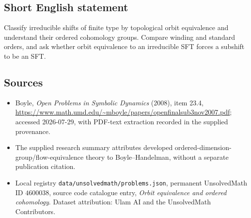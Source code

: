 \documentclass[11pt]{article}
\begin{document}
\subsection{Short English statement}
Classify irreducible shifts of finite type by topological orbit equivalence and understand their ordered cohomology groups. Compare winding and standard orders, and ask whether orbit equivalence to an irreducible SFT forces a subshift to be an SFT.
\subsection{Sources}
\begin{itemize}
\item Boyle, \emph{Open Problems in Symbolic Dynamics} (2008), item 23.4, \url{https://www.math.umd.edu/~mboyle/papers/openfinalsub3nov2007.pdf}; accessed 2026-07-29, with PDF-text extraction recorded in the supplied provenance.
\item The supplied research summary attributes developed ordered-dimension-group/flow-equivalence theory to Boyle--Handelman, without a separate publication citation.
\item Local registry \texttt{data/unsolvedmath/problems.json}, permanent UnsolvedMath ID $4600038$, source code catalogue entry, \emph{Orbit equivalence and ordered cohomology}. Dataset attribution: Ulam AI and the UnsolvedMath Contributors.
\end{itemize}
\end{document}
